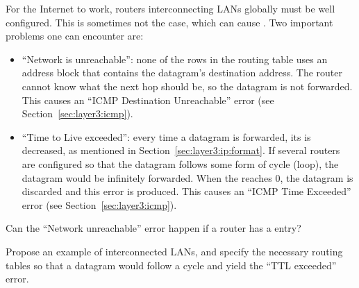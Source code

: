 For the Internet to work, routers interconnecting LANs globally must be well configured. 
This is sometimes not the case, which can cause . Two important problems 
one can encounter are:
\begin{itemize}
\item ``Network is unreachable'': none of the rows in the routing table uses an address block that contains the 
  datagram's destination address. 
  The router cannot know what the next hop should be, so the datagram is not forwarded.
  This causes an ``ICMP Destination Unreachable'' error (see Section~\ref{sec:layer3:icmp}).
  
\item ``Time to Live exceeded'': every time a datagram is forwarded,
  its  is decreased, as mentioned in Section~\ref{sec:layer3:ip:format}. 
  If several routers are configured so that the datagram follows some form of cycle (loop), 
  the datagram would be infinitely forwarded.
  When the  reaches 0, the datagram is discarded and this error is produced.
  This causes an ``ICMP Time Exceeded'' error (see Section~\ref{sec:layer3:icmp}).
\end{itemize}

\begin{exercise}
Can the ``Network unreachable'' error happen if a router has a  entry?
\end{exercise}

\begin{exercise}
Propose an example of interconnected LANs, and specify the necessary routing tables so that a datagram 
would follow a cycle and yield the ``TTL exceeded'' error.
\end{exercise}

